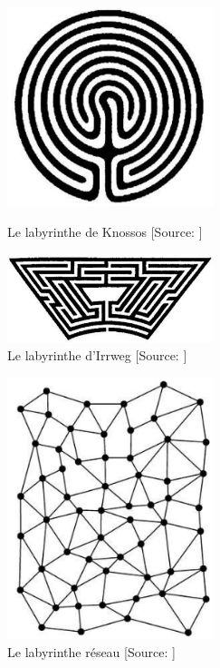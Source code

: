 \begin{figure}[!h]
\centering
\begin{minipage}[c]{.46\linewidth}
	\includegraphics[width=6cm]{images/laby_knossos.png}
	\caption[Le labyrinthe de Knossos]{Le labyrinthe de Knossos [Source: \cite[ch. 1.5]{eco_arbre_2010}]}
	\label{laby_knossos}
\end{minipage}
\begin{minipage}[c]{.46\linewidth}
	\includegraphics[width=6cm]{images/laby_irrweg.png}
	\caption[Le labyrinthe d'Irrweg]{Le labyrinthe d'Irrweg [Source: \cite[ch. 1.5]{eco_arbre_2010}]}
	\label{laby_irrweg}
\end{minipage}
\end{figure}

\begin{figure}[!h]
\centering
\includegraphics[width=6cm]{images/laby_reseau.png}
\caption[Le labyrinthe réseau]{Le labyrinthe réseau [Source: \cite[ch. 1.5]{eco_arbre_2010}]}
\label{laby_reseau}
\end{figure}

